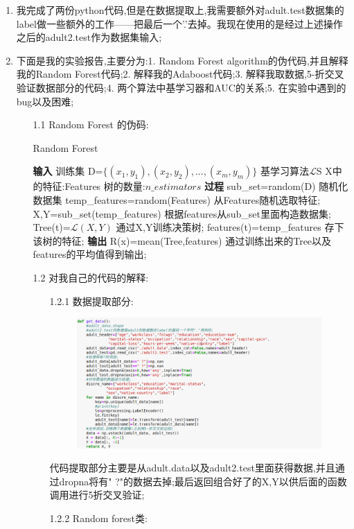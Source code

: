 \documentclass[11pt, a4paper, UTF8]{ctexart}
\begin{document}
\begin{solution}
\begin{enumerate}	
\item 我完成了两份python代码,但是在数据提取上,我需要额外对adult.test数据集的label做一些额外的工作——把最后一个'.'去掉。我现在使用的是经过上述操作之后的adult2.test作为数据集输入;
\item 下面是我的实验报告,主要分为:1. Random Forest algorithm的伪代码,并且解释我的Random Forest代码;2. 解释我的Adaboost代码;3. 解释我取数据,5-折交叉验证数据部分的代码;4. 两个算法中基学习器和AUC的关系;5. 在实验中遇到的bug以及困难;
\begin{enumerate}
\item[1.1] Random Forest 的伪码:
\begin{algorithm}
\caption{Random Forest}
\label{alg:A}
\begin{algorithmic}
\STATE \textbf{输入}
\STATE 训练集 D=$\{(x_1,y_1),(x_2,y_2),...,(x_m,y_m)\}$
\STATE 基学习算法$\mathcal{L}$S
\STATE X中的特征:Features
\STATE 树的数量:$n\_ estimators$
\STATE \textbf{过程}
\STATE sub\_set=random(D) 随机化数据集
\STATE temp\_features=random(Features) 从Features随机选取特征;
\STATE X,Y=sub\_set(temp\_features) 根据features从sub\_set里面构造数据集;
\STATE Tree(t)=$\mathcal{L}(X,Y)$ 通过X,Y训练决策树;
\STATE features(t)=temp\_features 存下该树的特征;
\ENDFOR
\STATE \textbf{输出}
\STATE R(x)=mean(Tree,features) 通过训练出来的Tree以及features的平均值得到输出;
\end{algorithmic}
\end{algorithm}

\item[1.2] 对我自己的代码的解释:
\begin{enumerate}
\item[1.2.1]数据提取部分: 
 \begin{figure}[!htbp]
	\centering
	\includegraphics[scale=0.49]{hw51.png}
\end{figure}
	代码提取部分主要是从adult.data以及adult2.test里面获得数据,并且通过dropna将有" ?"的数据去掉;最后返回组合好了的X,Y以供后面的函数调用进行5折交叉验证;
\item[1.2.2]Random forest类:
\begin{itemize}


\end{itemize}
\end{enumerate}
\end{enumerate}
\end{enumerate}
\end{solution}
\end{document}
